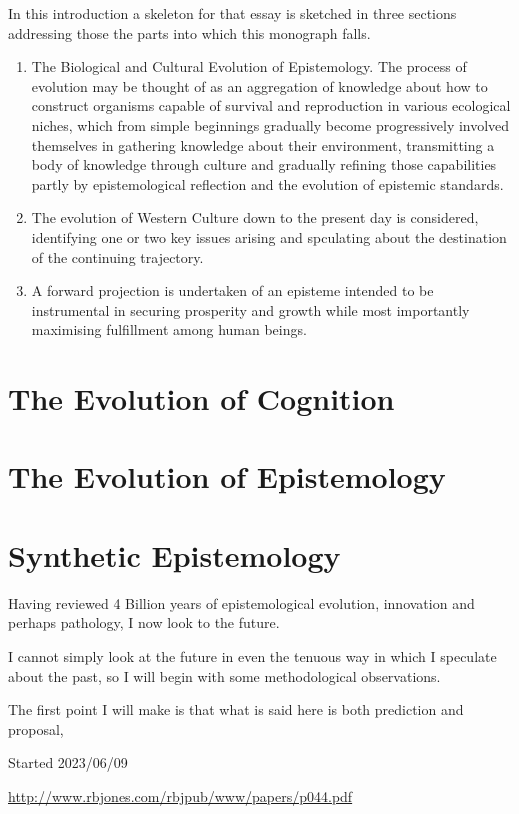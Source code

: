 \documentclass[10pt,titlepage]{article}
\begin{document}
In this introduction a skeleton for that essay is sketched in three sections addressing those the parts into which this monograph falls.

\begin{enumerate}
\item The Biological and Cultural Evolution of Epistemology.
The process of evolution may be thought of as an aggregation of knowledge about how to construct organisms capable of survival and reproduction in various ecological niches, which from simple beginnings gradually become progressively involved themselves in gathering knowledge about their environment, transmitting a body of knowledge through culture and gradually refining those capabilities partly by epistemological reflection and the evolution of epistemic standards.
\item The evolution of Western Culture down to the present day is considered, identifying one or two key issues arising and spculating about the destination of the continuing trajectory.
\item A forward projection is undertaken of an episteme intended to be instrumental in securing prosperity and growth while most importantly maximising fulfillment among human beings. 
\end{enumerate}

\section{The Evolution of Cognition}

\section{The Evolution of Epistemology}

\section{Synthetic Epistemology}

Having reviewed 4 Billion years of epistemological evolution, innovation and perhaps pathology, I now look to the future.

I cannot simply look at the future in even the tenuous way in which I speculate about the past, so I will begin with some methodological observations.

The first point I will make is that what is said here is both prediction and proposal,




{}





\tiny{
Started 2023/06/09


\href{http://www.rbjones.com/rbjpub/www/papers/p044.pdf}{http://www.rbjones.com/rbjpub/www/papers/p044.pdf}

}%
\end{document}
